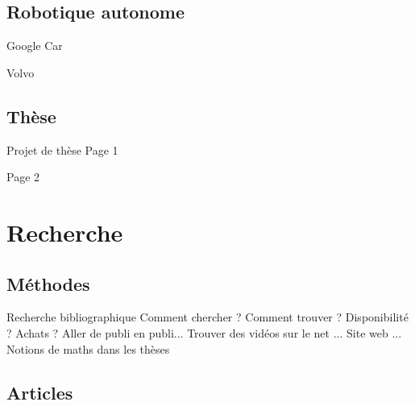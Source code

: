 \documentclass{beamer}
\begin{document}
\subsection*{Robotique autonome}

\begin{frame}
  Google Car
\end{frame}

\begin{frame}
  Volvo
\end{frame}

\subsection*{Thèse}

\begin{frame}{Projet de thèse}
  Page 1
\end{frame}

\begin{frame}
  Page 2
\end{frame}


\section{Recherche}
\subsection*{Méthodes}

\begin{frame}{Recherche bibliographique}
  Comment chercher ?
  Comment trouver ?
  Disponibilité ?
  Achats ?
  Aller de publi en publi...
  Trouver des vidéos sur le net ...
  Site web ...
  Notions de maths dans les thèses
\end{frame}

\subsection*{Articles}
\end{document}
